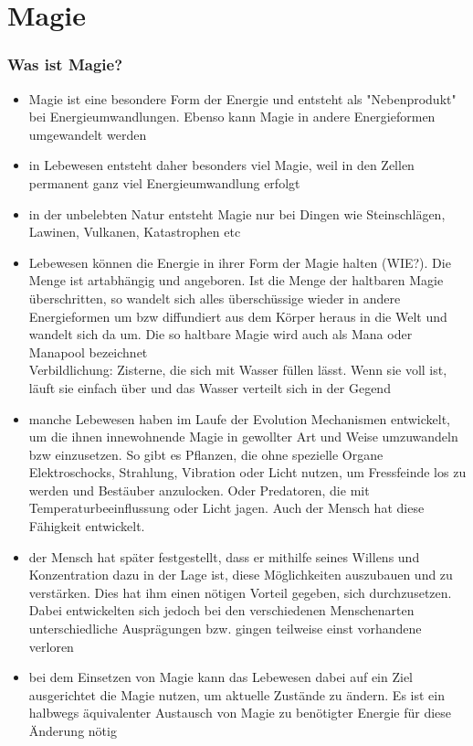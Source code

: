 \chapter{Magie}
\subsection{Was ist Magie?}
\begin{itemize}
	\item Magie ist eine besondere Form der Energie und entsteht als "Nebenprodukt" bei Energieumwandlungen. Ebenso kann Magie in andere Energieformen umgewandelt werden
	\item in Lebewesen entsteht daher besonders viel Magie, weil in den Zellen permanent ganz viel Energieumwandlung erfolgt
	\item in der unbelebten Natur entsteht Magie nur bei Dingen wie Steinschlägen, Lawinen, Vulkanen, Katastrophen etc
	\item Lebewesen können die Energie in ihrer Form der Magie halten (WIE?). Die Menge ist artabhängig und angeboren. Ist die Menge der haltbaren Magie überschritten, so wandelt sich alles überschüssige wieder in andere Energieformen um bzw diffundiert aus dem Körper heraus in die Welt und wandelt sich da um. Die so haltbare Magie wird auch als Mana oder Manapool bezeichnet \\
	Verbildlichung:  Zisterne, die sich mit Wasser füllen lässt. Wenn sie voll ist, läuft sie einfach über und das Wasser verteilt sich in der Gegend
	\item manche Lebewesen haben im Laufe der Evolution Mechanismen entwickelt, um die ihnen innewohnende Magie in gewollter Art und Weise umzuwandeln bzw einzusetzen. So gibt es Pflanzen, die ohne spezielle Organe Elektroschocks, Strahlung, Vibration oder Licht nutzen, um Fressfeinde los zu werden und Bestäuber anzulocken. Oder Predatoren, die mit Temperaturbeeinflussung oder Licht jagen. Auch der Mensch hat diese Fähigkeit entwickelt.
	\item der Mensch hat später festgestellt, dass er mithilfe seines Willens und Konzentration dazu in der Lage ist, diese Möglichkeiten auszubauen und zu verstärken. Dies hat ihm einen nötigen Vorteil gegeben, sich durchzusetzen. Dabei entwickelten sich jedoch bei den verschiedenen Menschenarten unterschiedliche Ausprägungen bzw. gingen teilweise einst vorhandene verloren
	\item bei dem Einsetzen von Magie kann das Lebewesen dabei auf ein Ziel ausgerichtet die Magie nutzen, um aktuelle Zustände zu ändern. Es ist ein halbwegs äquivalenter Austausch von Magie zu benötigter Energie für diese Änderung nötig

\end{itemize}
